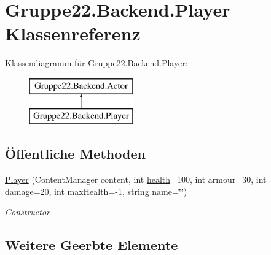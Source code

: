 \hypertarget{class_gruppe22_1_1_backend_1_1_player}{\section{Gruppe22.\-Backend.\-Player Klassenreferenz}
\label{class_gruppe22_1_1_backend_1_1_player}
}
Klassendiagramm für Gruppe22.\-Backend.\-Player\-:\begin{figure}[H]
\begin{center}
\leavevmode
\includegraphics[height=2.000000cm]{class_gruppe22_1_1_backend_1_1_player}
\end{center}
\end{figure}
\subsection*{Öffentliche Methoden}
\begin{DoxyCompactItemize}
\item 
\hyperlink{class_gruppe22_1_1_backend_1_1_player_ae560b7beb6ae89c6cab458cdbd2cd4bf}{Player} (Content\-Manager content, int \hyperlink{class_gruppe22_1_1_backend_1_1_actor_a46f3a7d62de83a6bf3c44cd52f38af9b}{health}=100, int armour=30, int \hyperlink{class_gruppe22_1_1_backend_1_1_actor_a461e2480a59de23517c3b375dede10fb}{damage}=20, int \hyperlink{class_gruppe22_1_1_backend_1_1_actor_aac0f2f9a2f0b314f98ba19d0b38a7a97}{max\-Health}=-\/1, string \hyperlink{class_gruppe22_1_1_backend_1_1_actor_a28129eaf9d70d9bfc33a29544ba74edf}{name}=\char`\"{}\char`\"{})
\begin{DoxyCompactList}\small\item\em Constructor \end{DoxyCompactList}\end{DoxyCompactItemize}
\subsection*{Weitere Geerbte Elemente}


